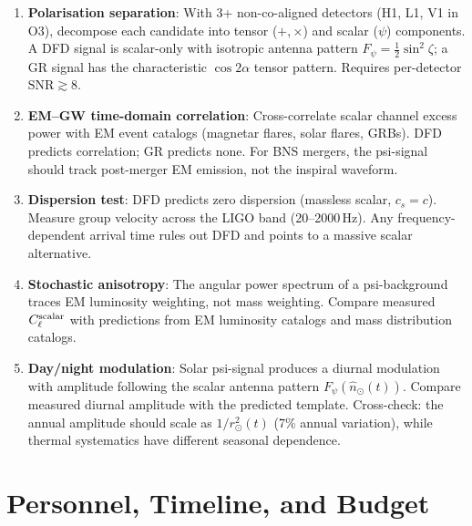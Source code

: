 \documentclass[11pt]{article}
\newcommand{\SNR}{\mathrm{SNR}}
\begin{document}
\begin{enumerate}
\item \textbf{Polarisation separation}: With 3+ non-co-aligned detectors
  (H1, L1, V1 in O3), decompose each candidate into tensor ($+, \times$)
  and scalar ($\psi$) components. A DFD signal is scalar-only with
  isotropic antenna pattern $F_\psi = \frac{1}{2}\sin^2\zeta$; a GR
  signal has the characteristic $\cos 2\alpha$ tensor pattern. Requires
  per-detector $\SNR \gtrsim 8$.

\item \textbf{EM--GW time-domain correlation}: Cross-correlate scalar
  channel excess power with EM event catalogs (magnetar flares, solar
  flares, GRBs). DFD predicts correlation; GR predicts none. For BNS
  mergers, the psi-signal should track post-merger EM emission, not the
  inspiral waveform.

\item \textbf{Dispersion test}: DFD predicts zero dispersion (massless
  scalar, $c_s = c$). Measure group velocity across the LIGO band
  (20--2000\,Hz). Any frequency-dependent arrival time rules out DFD
  and points to a massive scalar alternative.

\item \textbf{Stochastic anisotropy}: The angular power spectrum of a
  psi-background traces EM luminosity weighting, not mass weighting.
  Compare measured $C_\ell^{\rm scalar}$ with predictions from EM
  luminosity catalogs and mass distribution catalogs.

\item \textbf{Day/night modulation}: Solar psi-signal produces a
  diurnal modulation with amplitude following the scalar antenna
  pattern $F_\psi(\hat{n}_\odot(t))$. Compare measured diurnal
  amplitude with the predicted template. Cross-check: the annual
  amplitude should scale as $1/r_\odot^2(t)$ (7\% annual variation),
  while thermal systematics have different seasonal dependence.
\end{enumerate}

\section{Personnel, Timeline, and Budget}
\end{document}
